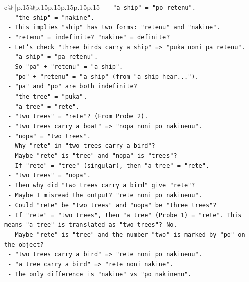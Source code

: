 \documentclass{article}
\begin{document}
{\begin{supertabular}{c@{$\;$}|p{.15\linewidth}@{}p{.15\linewidth}p{.15\linewidth}p{.15\linewidth}p{.15\linewidth}p{.15\linewidth}}
{{{\texttt{   {-} "a ship" = "po retenu".} \\
\texttt{   {-} "the ship" = "nakine".} \\
\texttt{   {-} This implies "ship" has two forms: "retenu" and "nakine".} \\
\texttt{   {-} "retenu" = indefinite? "nakine" = definite?} \\
\texttt{   {-} Let's check "three birds carry a ship" => "puka noni pa retenu".} \\
\texttt{   {-} "a ship" = "pa retenu".} \\
\texttt{   {-} So "pa" + "retenu" = "a ship".} \\
\texttt{   {-} "po" + "retenu" = "a ship" (from "a ship hear...").} \\
\texttt{   {-} "pa" and "po" are both indefinite?} \\
\texttt{   {-} "the tree" = "puka".} \\
\texttt{   {-} "a tree" = "rete".} \\
\texttt{   {-} "two trees" = "rete"? (From Probe 2).} \\
\texttt{   {-} "two trees carry a boat" => "nopa noni po nakinenu".} \\
\texttt{   {-} "nopa" = "two trees".} \\
\texttt{   {-} Why "rete" in "two trees carry a bird"?} \\
\texttt{   {-} Maybe "rete" is "tree" and "nopa" is "trees"?} \\
\texttt{   {-} If "rete" = "tree" (singular), then "a tree" = "rete".} \\
\texttt{   {-} "two trees" = "nopa".} \\
\texttt{   {-} Then why did "two trees carry a bird" give "rete"?} \\
\texttt{   {-} Maybe I misread the output? "rete noni po nakinenu".} \\
\texttt{   {-} Could "rete" be "two trees" and "nopa" be "three trees"?} \\
\texttt{   {-} If "rete" = "two trees", then "a tree" (Probe 1) = "rete". This means "a tree" is translated as "two trees"? No.} \\
\texttt{   {-} Maybe "rete" is "tree" and the number "two" is marked by "po" on the object?} \\
\texttt{   {-} "two trees carry a bird" => "rete noni po nakinenu".} \\
\texttt{   {-} "a tree carry a bird" => "rete noni nakine".} \\
\texttt{   {-} The only difference is "nakine" vs "po nakinenu".} \\
}}}
\end{supertabular}}
\end{document}
